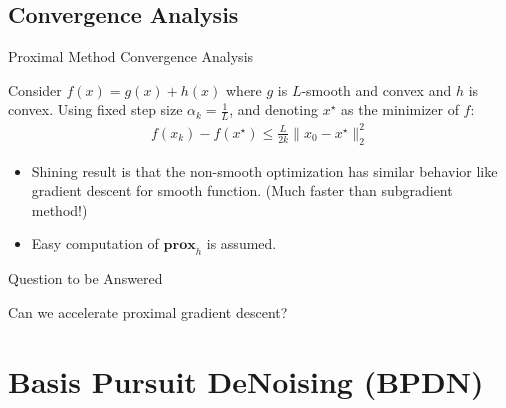 \documentclass{beamer}
\begin{document}
\subsection{Convergence Analysis}
\begin{frame}{Proximal Method Convergence Analysis}
    \begin{theorem}
        Consider $f(x)=g(x)+h(x)$ where $g$ is $L$-smooth and convex and $h$ is convex. Using fixed step size $\alpha_k=\frac{1}{L}$, and denoting $x^\star$ as the minimizer of $f$:
        \begin{align*}
            f(x_k)-f(x^\star)\leq\frac{L}{2k}\|x_0-x^\star\|_2^2
        \end{align*}
    \end{theorem}
    \pause
    \begin{itemize}
        \item Shining result is that the non-smooth optimization has similar behavior like gradient descent for smooth function. (Much faster than subgradient method!)
        \pause
        \item Easy computation of $\mathbf{prox}_{h}$ is assumed.
    \end{itemize}
\end{frame}

\begin{frame}{Question to be Answered}
\begin{center}
Can we accelerate proximal gradient descent?
\end{center}
\end{frame}


\section{Basis Pursuit DeNoising (BPDN)}

\end{document}
